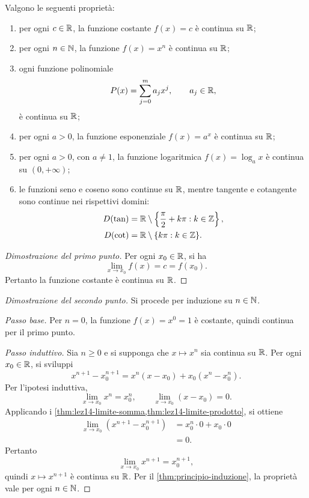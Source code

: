 \begin{proposition}
\label{prop:lez21-continuita-elementari}
Valgono le seguenti proprietà:
\begin{enumerate}
  \item per ogni \(c\in\mathbb{R}\), la funzione costante
  \(f(x)=c\) è continua su \(\mathbb{R}\);
  \item per ogni \(n\in\mathbb{N}\), la funzione
  \(f(x)=x^n\) è continua su \(\mathbb{R}\);
  \item ogni funzione polinomiale
  \[
    P(x)=\sum_{j=0}^{m}a_jx^j,
    \qquad a_j\in\mathbb{R},
  \]
  è continua su \(\mathbb{R}\);
  \item per ogni \(a>0\), la funzione esponenziale
  \(f(x)=a^x\) è continua su \(\mathbb{R}\);
  \item per ogni \(a>0\), con \(a\ne1\), la funzione
  logaritmica \(f(x)=\log_a x\) è continua su
  \((0,+\infty)\);
  \item le funzioni seno e coseno sono continue su
  \(\mathbb{R}\), mentre tangente e cotangente sono continue
  nei rispettivi domini:
  \[
  \begin{aligned}
    D(\tan)&=\mathbb{R}\setminus
      \left\{\frac\pi2+k\pi:k\in\mathbb{Z}\right\},\\
    D(\cot)&=\mathbb{R}\setminus
      \{k\pi:k\in\mathbb{Z}\}.
  \end{aligned}
  \]
\end{enumerate}
\end{proposition}

\clearpage

\begin{proof}[Dimostrazione del primo punto]
Per ogni \(x_0\in\mathbb{R}\), si ha
\[
  \lim_{x\to x_0}f(x)=c=f(x_0).
\]
Pertanto la funzione costante è continua su \(\mathbb{R}\).
\end{proof}

\begin{proof}[Dimostrazione del secondo punto]
Si procede per induzione su \(n\in\mathbb{N}\).

\emph{Passo base.}
Per \(n=0\), la funzione \(f(x)=x^0=1\)
è costante, quindi continua per il primo punto.

\emph{Passo induttivo.}
Sia \(n\ge0\) e si supponga che \(x\mapsto x^n\)
sia continua su \(\mathbb{R}\). Per ogni \(x_0\in\mathbb{R}\),
si sviluppi
\[
  x^{n+1}-x_0^{n+1}
  =x^n(x-x_0)+x_0(x^n-x_0^n).
\]
Per l'ipotesi induttiva,
\[
  \lim_{x\to x_0}x^n=x_0^n,
  \qquad
  \lim_{x\to x_0}(x-x_0)=0.
\]
Applicando i
\cref{thm:lez14-limite-somma,thm:lez14-limite-prodotto},
si ottiene
\[
\begin{aligned}
  \lim_{x\to x_0}(x^{n+1}-x_0^{n+1})
  &=x_0^n\cdot0+x_0\cdot0\\
  &=0.
\end{aligned}
\]
Pertanto
\[
  \lim_{x\to x_0}x^{n+1}=x_0^{n+1},
\]
quindi \(x\mapsto x^{n+1}\) è continua su \(\mathbb{R}\).
Per il \cref{thm:principio-induzione}, la proprietà
vale per ogni \(n\in\mathbb{N}\).
\end{proof}

